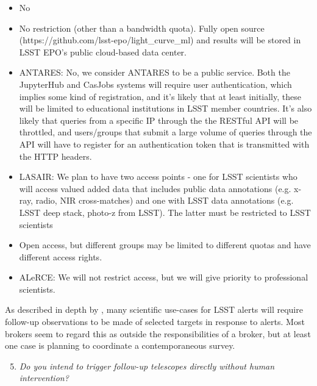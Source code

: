 \documentclass{article}
\begin{document}
\begin{itemize}
\item No
\item No restriction (other than a bandwidth quota).  Fully open source \\(https://github.com/lsst-epo/light\_curve\_ml) and results will be stored in LSST EPO’s public cloud-based data center.
\item ANTARES: No, we consider ANTARES to be a public service. Both the JupyterHub and CasJobs systems will require user authentication, which implies some kind of registration, and it’s likely that at least initially, these will be limited to educational institutions in LSST member countries. It’s also likely that queries from a specific IP through the the RESTful API will be throttled, and users/groups that submit a large volume of queries through the API will have to register for an authentication token that is transmitted with the HTTP headers. 
\item LASAIR: We plan to have two access points - one for LSST scientists who will access valued added data that includes public data annotations (e.g. x-ray, radio, NIR cross-matches) and one with LSST data annotations (e.g. LSST deep stack, photo-z from LSST). The latter must be restricted to LSST scientists 
\item Open access, but different groups may be limited to different quotas and have different access rights.
\item ALeRCE: We will not restrict access, but we will give priority to professional scientists.
\end{itemize}

As described in depth by \cite{Najita2016}, many scientific use-cases for LSST alerts will require follow-up observations to be made of selected targets in response to alerts.  Most brokers seem to regard this as outside the responsibilities of a broker, but at least one case is planning to coordinate a contemporaneous survey.  

\begin{enumerate}
\setcounter{enumi}{4}
\item {\em Do you intend to trigger follow-up telescopes directly without human intervention?}
\end{enumerate}
\end{document}
